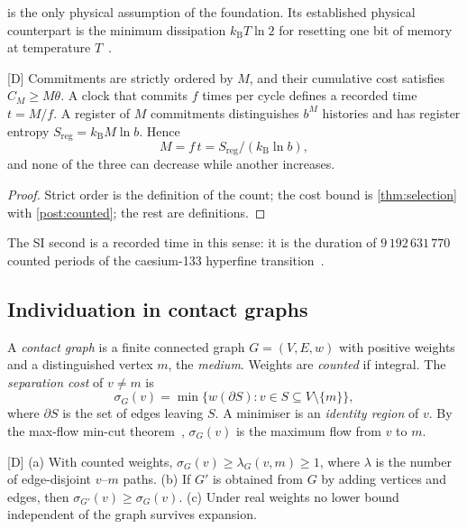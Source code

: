 \documentclass[10pt,twocolumn,a4paper]{article}
\newcommand{\kB}{k_{\mathrm{B}}}
\newcommand{\med}{m}
\newcommand{\sep}{\sigma}
\newcommand{\cut}{\partial}
\newcommand{\D}{\textsf{[D]}}
\begin{document}
 is the only physical assumption of the foundation. Its
established physical counterpart is the minimum dissipation
$\kB T\ln2$ for resetting one bit of memory at temperature
$T$~\citep{landauer1961,bennett1982,berut2012}.

\begin{proposition}
\label{prop:direction}
\D{} Commitments are strictly ordered by $M$, and their cumulative cost
satisfies $C_M\ge M\theta$. A clock that commits $f$ times per cycle defines a
recorded time $t=M/f$. A register of $M$ commitments distinguishes $b^M$
histories and has register entropy $S_{\mathrm{reg}}=\kB M\ln b$. Hence
\begin{equation}
M=f\,t=S_{\mathrm{reg}}/(\kB\ln b),
\label{eq:three}
\end{equation}
and none of the three can decrease while another increases.
\end{proposition}

\begin{proof}
Strict order is the definition of the count; the cost bound is
\cref{thm:selection} with \cref{post:counted}; the rest are definitions.
\end{proof}

The SI second is a recorded time in this sense: it is the duration of
$9\,192\,631\,770$ counted periods of the caesium-133 hyperfine
transition~\citep{bipm2019}.

\subsection{Individuation in contact graphs}

\begin{definition}
\label{def:sep}
A \emph{contact graph} is a finite connected graph $G=(V,E,w)$ with positive
weights and a distinguished vertex $\med$, the \emph{medium}. Weights are
\emph{counted} if integral. The \emph{separation cost} of $v\ne\med$ is
\begin{equation}
\sep_G(v)=\min\{w(\cut S):v\in S\subseteq V\setminus\{\med\}\},
\end{equation}
where $\cut S$ is the set of edges leaving $S$. A minimiser is an
\emph{identity region} of $v$. By the max-flow min-cut
theorem~\citep{ford1956}, $\sep_G(v)$ is the maximum flow from $v$ to $\med$.
\end{definition}

\begin{theorem}
\label{thm:indiv}
\D{} (a) With counted weights, $\sep_G(v)\ge\lambda_G(v,\med)\ge1$, where
$\lambda$ is the number of edge-disjoint $v$--$\med$ paths. (b) If $G'$ is
obtained from $G$ by adding vertices and edges, then
$\sep_{G'}(v)\ge\sep_G(v)$. (c) Under real weights no lower bound
independent of the graph survives expansion.
\end{theorem}
\end{document}
